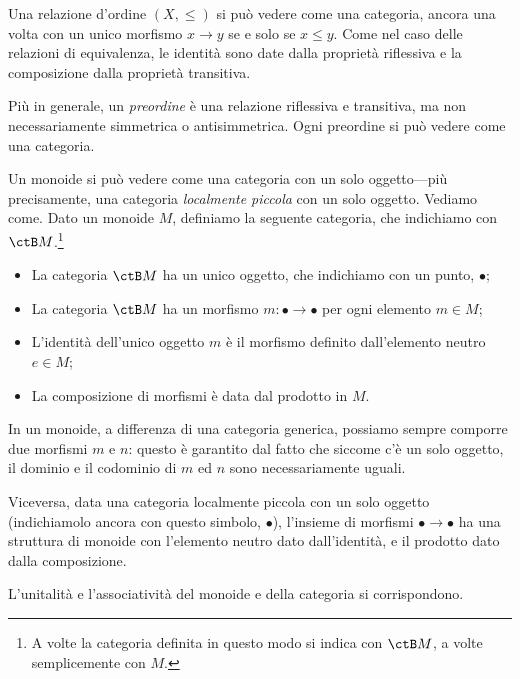 \begin{examples}
 Una relazione d'ordine $(X,\le)$ si può vedere come una categoria, ancora una volta con un unico morfismo $x\to y$ se e solo se $x\le y$. Come nel caso delle relazioni di equivalenza, le identità sono date dalla proprietà riflessiva e la composizione dalla proprietà transitiva.

 Più in generale, un \emph{preordine} è una relazione riflessiva e transitiva, ma non necessariamente simmetrica o antisimmetrica. Ogni preordine si può vedere come una categoria.
\end{examples}
\begin{theorem}\label{mon_sonocat}
\end{theorem}
\begin{theorem}
\end{theorem}
\color{blue}
\begin{example}
 Un monoide si può vedere come una categoria con un solo oggetto---più precisamente, una categoria \emph{localmente piccola} con un solo oggetto.
 Vediamo come. Dato un monoide $M$, definiamo la seguente categoria, che indichiamo con $\ctB M$.\footnote{A volte la categoria definita in questo modo si indica con $\ctB M$, a volte semplicemente con $M$.}
 \begin{itemize}
  \item La categoria $\ctB M$ ha un unico oggetto, che indichiamo con un punto, $\bullet$;
  \item La categoria $\ctB M$ ha un morfismo $m:\bullet\to\bullet$ per ogni elemento $m\in M$;
  \item L'identità dell'unico oggetto $m$ è il morfismo definito dall'elemento neutro $e\in M$;
  \item La composizione di morfismi è data dal prodotto in $M$.
 \end{itemize}
 In un monoide, a differenza di una categoria generica, possiamo sempre comporre due morfismi $m$ e $n$: questo è garantito dal fatto che siccome c'è un solo oggetto, il dominio e il codominio di $m$ ed $n$ sono necessariamente uguali.

 Viceversa, data una categoria localmente piccola con un solo oggetto (indichiamolo ancora con questo simbolo, $\bullet$), l'insieme di morfismi $\bullet\to\bullet$ ha una struttura di monoide con l'elemento neutro dato dall'identità, e il prodotto dato dalla composizione.

 L'unitalità e l'associatività del monoide e della categoria si corrispondono.
\end{example}

